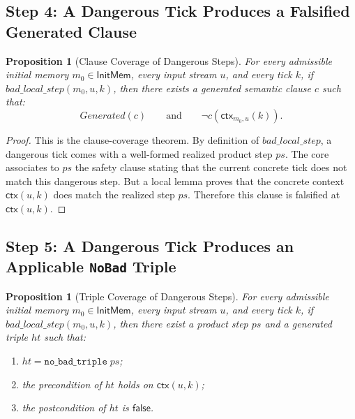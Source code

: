\documentclass[11pt,a4paper]{article}
\newtheorem{proposition}[definition]{Proposition}
\newcommand{\False}{\mathsf{false}}
\newcommand{\ctx}{\mathsf{ctx}}
\begin{document}
\subsection{Step 4: A Dangerous Tick Produces a Falsified Generated Clause}

\begin{proposition}[Clause Coverage of Dangerous Steps]
For every admissible initial memory \(m_0 \in \mathsf{InitMem}\), every input stream
\(u\), and every tick \(k\), if \(bad\_local\_step(m_0,u,k)\), then there
exists a generated semantic clause \(c\) such that:
\[
Generated(c)
\qquad\text{and}\qquad
\neg c(\ctx_{m_0,u}(k)).
\]
\end{proposition}

\begin{proof}
This is the clause-coverage theorem. By definition of
\(bad\_local\_step\), a dangerous tick comes with a well-formed realized product
step \(ps\). The core associates to \(ps\) the safety clause stating that the
current concrete tick does not match this dangerous step. But a local lemma
proves that the concrete context \(\ctx(u,k)\) does match the realized step
\(ps\). Therefore this clause is falsified at \(\ctx(u,k)\).
\end{proof}

\subsection{Step 5: A Dangerous Tick Produces an Applicable \texttt{NoBad} Triple}

\begin{proposition}[Triple Coverage of Dangerous Steps]
For every admissible initial memory \(m_0 \in \mathsf{InitMem}\), every input stream
\(u\), and every tick \(k\), if \(bad\_local\_step(m_0,u,k)\), then there
exist a product step \(ps\) and a generated triple \(ht\) such that:
\begin{enumerate}[leftmargin=1.4em]
\item \(ht = \texttt{no\_bad\_triple}\;ps\);
\item the precondition of \(ht\) holds on \(\ctx(u,k)\);
\item the postcondition of \(ht\) is \(\False\).
\end{enumerate}
\end{proposition}
\end{document}
